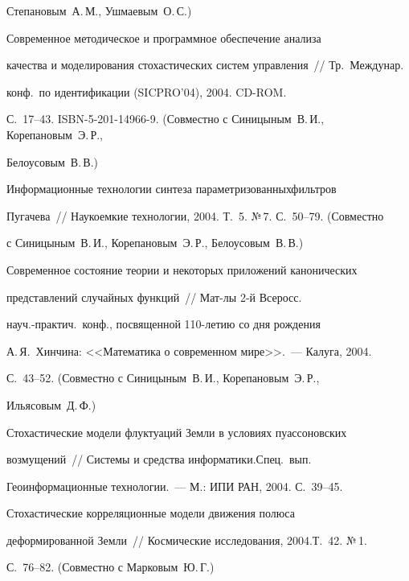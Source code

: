 Степановым~А.\,М., Ушмаевым~О.\,С.)





 Современное методическое и программное обеспечение анализа


качества и моделирования стохастических систем управления~// Тр.\ Междунар.\


конф.\ по идентификации (SICPRO'04), 2004. CD-ROM.


С.~17--43. ISBN-5-201-14966-9. (Совместно с Синицыным~В.\,И., Корепановым~Э.\,Р.,


Белоусовым~В.\,В.)





 Информационные технологии синтеза параметризованных\linebreak фильтров


Пугачева~// Наукоемкие технологии, 2004. Т.~5. №\,7. С.~50--79. (Совместно


с Синицыным~В.\,И., Корепановым~Э.\,Р., Белоусовым~В.\,В.)





 Современное состояние теории и некоторых приложений канонических


представлений случайных функций~// Мат-лы 2-й Всеросс.\


 науч.-практич.\ конф., посвященной 110-летию со дня рож\-де\-ния


А.\,Я.~Хинчина: <<Математика о современном мире>>.~--- Калуга, 2004.


 С.~43--52. (Совместно с Синицыным~В.\,И., Корепановым~Э.\,Р.,


Ильясовым~Д.\,Ф.)





 Стохастические модели флуктуаций Земли в условиях пуассоновских


возмущений~// Системы и средства информатики.\linebreak Спец.\ вып.\


Геоинформационные технологии.~--- М.: ИПИ РАН, 2004. С.~39--45.





 Стохастические корреляционные модели движения полюса


деформированной Земли~// Космические исследования, 2004.\linebreak Т.~42. №\,1.


С.~76--82. (Совместно с Марковым~Ю.\,Г.)





